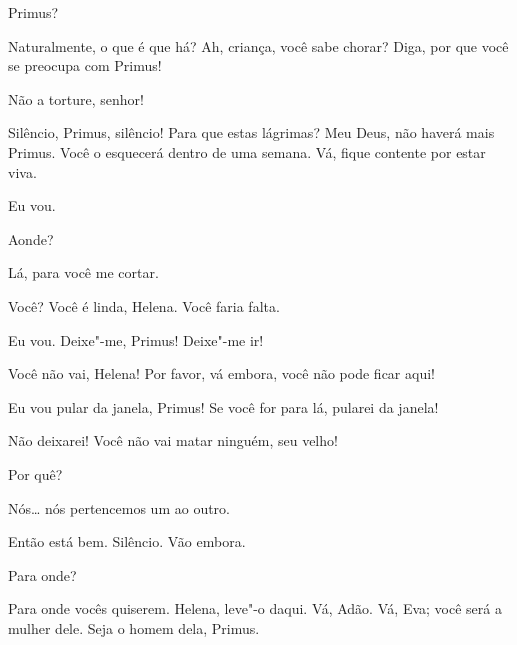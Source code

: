   Primus?

 Naturalmente, o que é que há? Ah, criança, você sabe chorar? Diga,
por que você se preocupa com Primus!

 Não a torture, senhor!

 Silêncio, Primus, silêncio! Para que estas lágrimas? Meu Deus,
não haverá mais Primus. Você o esquecerá dentro de uma semana. Vá, fique
contente por estar viva.

  Eu vou.

 Aonde?

 Lá, para você me cortar.

 Você? Você é linda, Helena. Você faria falta.

 Eu vou.  Deixe"-me, Primus! Deixe"-me ir!

 Você não vai, Helena! Por favor, vá embora, você não pode ficar aqui!

 Eu vou pular da janela, Primus! Se você for para lá, pularei da janela!

  Não deixarei!  Você não
vai matar ninguém, seu velho!

 Por quê?

 Nós\ldots{} nós pertencemos um ao outro.

 Então está bem.  Silêncio. Vão embora.

 Para onde?

  Para onde vocês quiserem. Helena, leve"-o daqui.
 Vá, Adão. Vá, Eva; você será a mulher dele. Seja o homem dela,
Primus.

